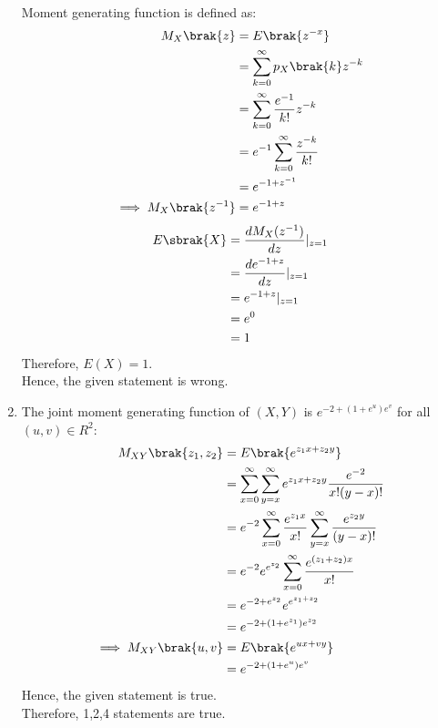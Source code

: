\documentclass[journal,12pt,twocolumn]{IEEEtran}
\theoremstyle{remark}
\begin{document}
\begin{enumerate}
\begin{align}
\end{align}
Moment generating function is defined as:
\begin{align}
M_X\brak{z} &= E\brak{z^{-x}}\\
&= \sum_{k=0}^{\infty} p_X\brak{k}z^{-k}\\
&= \sum_{k=0}^{\infty} \frac{e^{-1}}{k!}z^{-k}\\
&= e^{-1} \sum_{k=0}^{\infty} \frac{z^{-k}}{k!}\\
&= e^{-1+z^{-1}}\\
\implies M_X\brak{z^{-1}} &= e^{-1+z}
\end{align}
\begin{align}
E\sbrak{X}&= \frac{dM_{X}(z^{-1})}{dz}\vert_{z=1}\\
&= \frac{de^{-1+z}}{dz}\vert_{z=1}\\
&= e^{-1+z}\vert_{z=1}\\
&= e^{0}\\
&= 1
\end{align}
Therefore, ${E(X) = 1}$.\\
Hence, the given statement is wrong.
\item The joint moment generating function of $(X,Y)$ is $e^{-2+(1 + e^u)e^v}$ for all $(u,v) \in {R^2}$:
\begin{align}
M_{XY}\brak{z_1,z_2} &= E\brak{e^{z_1x+z_2y}}\\
&= \sum_{x=0}^{\infty} \sum_{y=x}^{\infty} e^{z_1x+z_2y}\frac{e^{-2}}{x!(y - x)!}\\
&= e^{-2} \sum_{x=0}^{\infty} \frac{e^{z_1x}}{x!} \sum_{y=x}^{\infty}\frac{e^{z_2y}}{(y - x)!}\\
&= e^{-2}e^{e^{z_2}}\sum_{x=0}^{\infty} \frac{e^{(z_1+z_2)x}}{x!}\\
&= e^{-2+e^{z_2}}e^{e^{z_1+z_2}}\\
&= e^{-2+(1 + e^{z_1})e^{z_2}}\\
\implies M_{XY}\brak{u,v} &= E\brak{e^{ux+vy}}\\
&= e^{-2+(1 + e^u)e^v}
\end{align}
Hence, the given statement is true.\\
Therefore, 1,2,4 statements are true.
\end{enumerate}
\end{document}

